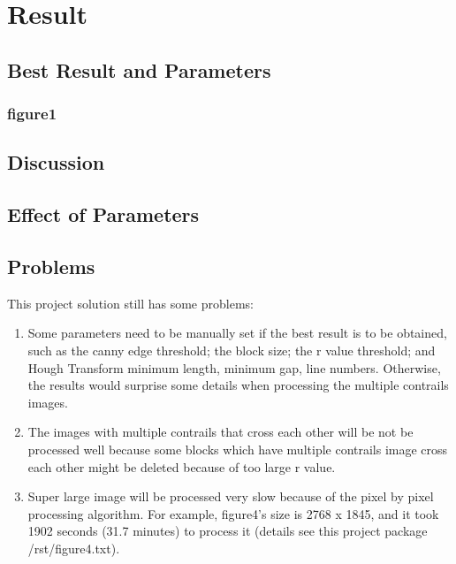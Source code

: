 \chapter{Result}

\section{Best Result and Parameters}
\subsection{figure1}


\section{Discussion}


\section{Effect of Parameters}



\section{Problems}
This project solution still has some problems:
\begin{enumerate}
\item Some parameters need to be manually set if the best result is to be obtained, such as the canny edge threshold; the block size; the r value threshold; and Hough Transform minimum length, minimum gap, line numbers. Otherwise, the results would surprise some details when processing the multiple contrails images.
\item The images with multiple contrails that cross each other will be not be processed well because some blocks which have multiple contrails image cross each other might be deleted because of too large r value.
\item Super large image will be processed very slow because of the pixel by pixel processing algorithm. For example, figure4’s size is 2768 x 1845, and it took 1902 seconds (31.7 minutes) to process it (details see this project package /rst/figure4.txt). 
\end{enumerate}